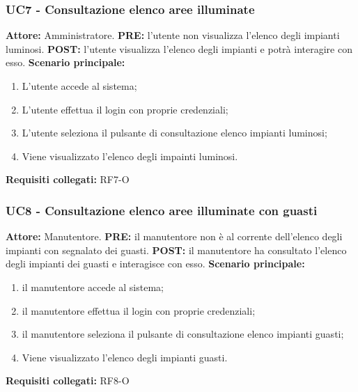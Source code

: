 \documentclass[a4paper, 12pt]{article}
\begin{document}
\subsubsection{UC7 - Consultazione elenco aree illuminate}
\textbf{Attore:} Amministratore. \newline
\textbf{PRE:} l'utente non visualizza l'elenco degli impianti luminosi.\newline
\textbf{POST:} l'utente visualizza l'elenco degli impianti e potrà interagire con esso.\newline
\textbf{Scenario principale:}
\begin{enumerate}
    \item L'utente accede al sistema;
    \item L'utente effettua il login con proprie credenziali;
    \item L'utente seleziona il pulsante di consultazione elenco impianti luminosi;
    \item Viene visualizzato l'elenco degli impainti luminosi.
\end{enumerate}
\textbf{Requisiti collegati:} RF7-O\newline

\subsubsection{UC8 - Consultazione elenco aree illuminate con guasti}
\textbf{Attore:} Manutentore.\newline
\textbf{PRE:} il manutentore non è al corrente dell'elenco degli impianti con segnalato dei guasti.\newline
\textbf{POST:} il manutentore ha consultato l'elenco degli impianti dei guasti e interagisce con esso.\newline
\textbf{Scenario principale:}
\begin{enumerate}
    \item il manutentore accede al sistema;
    \item il manutentore effettua il login con proprie credenziali;
    \item il manutentore seleziona il pulsante di consultazione elenco impianti guasti;
    \item Viene visualizzato l'elenco degli impianti guasti.
\end{enumerate}
\textbf{Requisiti collegati:} RF8-O\newline
\end{document}
